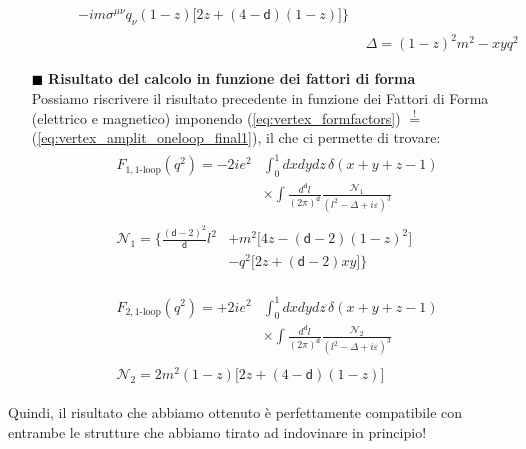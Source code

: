 \documentclass[../main.tex]{subfiles}
\begin{document}
\begin{itemize}
\begin{itemize}
\begin{equation}
\begin{aligned}
\begin{aligned}
                       & - im\sigma^{\mu\nu}q_\nu(1-z)\bigl[ 2z + (4-\mathsf d)(1-z) \bigr]\Bigg\}
                \end{aligned}\\
                &\Delta = (1-z)^2m^2 - xyq^2
            \end{aligned}
            \end{equation}
    \end{itemize}
    \item [\textcolor{Black}{$\blacksquare$}]\textbf{Risultato del calcolo in funzione dei fattori di forma}\\
        Possiamo riscrivere il risultato precedente in funzione dei Fattori di Forma (elettrico e magnetico) imponendo (\ref{eq:vertex_formfactors}) $\overset{!}{=}$ (\ref{eq:vertex_amplit_oneloop_final1}), il che ci permette di trovare:
        \begin{equation}
            \boxed{
            \begin{aligned}
                &\begin{aligned}
                F_{1,\text{1-loop}}(q^2) = -2ie^2&\int_0^1 dxdydz \,\delta(x+y+z-1) \\ 
                       &\times\int \frac{d^\mathsf d l}{(2\pi)^\mathsf d} \frac{\mathscr{N}_1}{(l^2-\Delta+i\varepsilon)^3}
                \end{aligned}\\
                &\begin{aligned}
                       \mathscr{N}_1 =\Bigg\{ \frac{(\mathsf d-2)^2}{\mathsf d}l^2 &+ m^2\bigl[ 4z - (\mathsf d - 2)(1-z)^2 \bigr]\\
                       & - q^2\bigl[ 2z + (\mathsf d - 2)xy \bigr]\Bigg\}
                \end{aligned}
            \end{aligned}}
            \label{eq:formfactor1_final}
        \end{equation}
        
        \begin{equation}
            \boxed{
            \begin{aligned}
                &\begin{aligned}
                F_{2,\text{1-loop}}(q^2) = +2ie^2&\int_0^1 dxdydz \,\delta(x+y+z-1) \\ 
                       &\times\int \frac{d^\mathsf d l}{(2\pi)^\mathsf d} \frac{\mathscr{N}_2}{(l^2-\Delta+i\varepsilon)^3}
                \end{aligned}\\
                &\begin{aligned}
                       \mathscr{N}_2 = 2m^2(1-z)\bigl[ 2z + (4-\mathsf d)(1-z) \bigr]
                \end{aligned}
            \end{aligned}}
            \label{eq:formfactor2_final}
        \end{equation}
\end{itemize}
Quindi, il risultato che abbiamo ottenuto è perfettamente compatibile con entrambe le strutture che abbiamo tirato ad indovinare in principio! 
\end{document}
